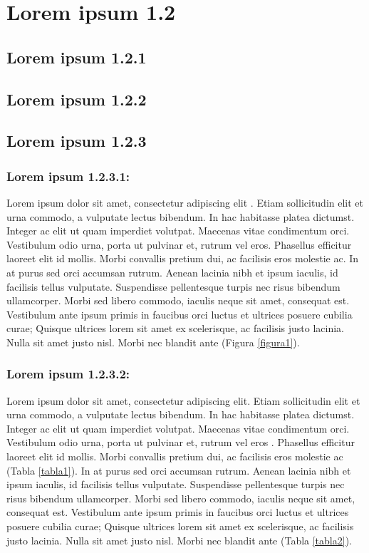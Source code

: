 \documentclass{wileySev}
\begin{document}
\lipsum[2-4]


\section{Lorem ipsum 1.2}


\subsection{Lorem ipsum 1.2.1}
\lipsum[2-4]
\subsection{Lorem ipsum 1.2.2}
\lipsum[2-4]
\subsection{Lorem ipsum 1.2.3}
\lipsum[2-4]

\subsubsection{Lorem ipsum 1.2.3.1:}
Lorem ipsum dolor sit amet, consectetur adipiscing elit \cite{Perez}. Etiam sollicitudin elit et urna commodo, a vulputate lectus bibendum. In hac habitasse platea dictumst. Integer ac elit ut quam imperdiet volutpat. Maecenas vitae condimentum orci. Vestibulum odio urna, porta ut pulvinar et, rutrum vel eros. Phasellus efficitur laoreet elit id mollis. Morbi convallis pretium dui, ac facilisis eros molestie ac. In at purus sed orci accumsan rutrum. Aenean lacinia nibh et ipsum iaculis, id facilisis tellus vulputate. Suspendisse pellentesque turpis nec risus bibendum ullamcorper. Morbi sed libero commodo, iaculis neque sit amet, consequat est. Vestibulum ante ipsum primis in faucibus orci luctus et ultrices posuere cubilia curae; Quisque ultrices lorem sit amet ex scelerisque, ac facilisis justo lacinia. Nulla sit amet justo nisl. Morbi nec blandit ante (Figura \ref{figura1}).

\subsubsection{Lorem ipsum 1.2.3.2:}
Lorem ipsum dolor sit amet, consectetur adipiscing elit. Etiam sollicitudin elit et urna commodo, a vulputate lectus bibendum. In hac habitasse platea dictumst. Integer ac elit ut quam imperdiet volutpat. Maecenas vitae condimentum orci. Vestibulum odio urna, porta ut pulvinar et, rutrum vel eros \cite{Nakamura}. Phasellus efficitur laoreet elit id mollis. Morbi convallis pretium dui, ac facilisis eros molestie ac (Tabla \ref{tabla1}). In at purus sed orci accumsan rutrum. Aenean lacinia nibh et ipsum iaculis, id facilisis tellus vulputate. Suspendisse pellentesque turpis nec risus bibendum ullamcorper. Morbi sed libero commodo, iaculis neque sit amet, consequat est. Vestibulum ante ipsum primis in faucibus orci luctus et ultrices posuere cubilia curae; Quisque ultrices lorem sit amet ex scelerisque, ac facilisis justo lacinia. Nulla sit amet justo nisl. Morbi nec blandit ante (Tabla \ref{tabla2}).
\end{document}
